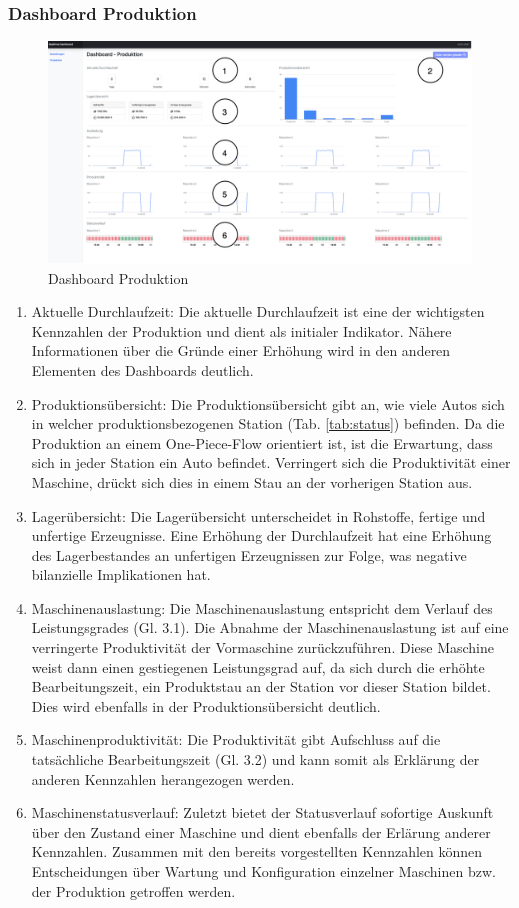 \subsubsection*{Dashboard Produktion}\label{abs:dashProd}
\begin{figure}[h]
    \centering
    \includegraphics[width=1\textwidth]{ausarbeitung-latex/img/DashboardProduktion.png}
    \caption{Dashboard Produktion}
    \label{fig:DashProd}
\end{figure}
\begin{enumerate}
    \item Aktuelle Durchlaufzeit: Die aktuelle Durchlaufzeit ist eine der wichtigsten Kennzahlen der Produktion und dient als initialer Indikator. Nähere Informationen über die Gründe einer Erhöhung wird in den anderen Elementen des Dashboards deutlich.
    \item Produktionsübersicht: Die Produktionsübersicht gibt an, wie viele Autos sich in welcher produktionsbezogenen Station (Tab. \ref{tab:status}) befinden. Da die Produktion an einem One-Piece-Flow orientiert ist, ist die Erwartung, dass sich in jeder Station ein Auto befindet. Verringert sich die Produktivität einer Maschine, drückt sich dies in einem Stau an der vorherigen Station aus.
    \item Lagerübersicht: Die Lagerübersicht unterscheidet in Rohstoffe, fertige und unfertige Erzeugnisse. Eine Erhöhung der Durchlaufzeit hat eine Erhöhung des Lagerbestandes an unfertigen Erzeugnissen zur Folge, was negative bilanzielle Implikationen hat.
    \item Maschinenauslastung: Die Maschinenauslastung entspricht dem Verlauf des Leistungsgrades (Gl. 3.1). Die Abnahme der Maschinenauslastung ist auf eine verringerte Produktivität der Vormaschine zurückzuführen. Diese Maschine weist dann einen gestiegenen Leistungsgrad auf, da sich durch die erhöhte Bearbeitungszeit, ein Produktstau an der Station vor dieser Station bildet. Dies wird ebenfalls in der Produktionsübersicht deutlich.
    \item Maschinenproduktivität: Die Produktivität gibt Aufschluss auf die tatsächliche Bearbeitungszeit (Gl. 3.2) und kann somit als Erklärung der anderen Kennzahlen herangezogen werden.
    \item Maschinenstatusverlauf: Zuletzt bietet der Statusverlauf sofortige Auskunft über den Zustand einer Maschine und dient ebenfalls der Erlärung anderer Kennzahlen. Zusammen mit den bereits vorgestellten Kennzahlen können Entscheidungen über Wartung und Konfiguration einzelner Maschinen bzw. der Produktion getroffen werden.
\end{enumerate}
